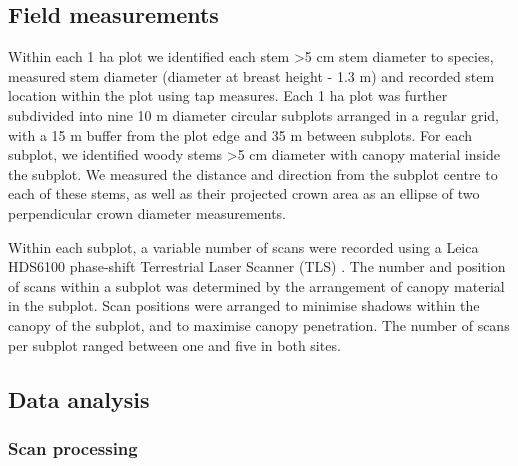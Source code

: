 \documentclass[11pt,a4paper]{article}
\begin{document}
\subsection{Field measurements}

Within each 1 ha plot we identified each stem >5 cm stem diameter to species, measured stem diameter (diameter at breast height - 1.3 m) and recorded stem location within the plot using tap measures. Each 1 ha plot was further subdivided into nine 10 m diameter circular subplots arranged in a regular grid, with a 15 m buffer from the plot edge and 35 m between subplots. For each subplot, we identified woody stems >5 cm diameter with canopy material inside the subplot. We measured the distance and direction from the subplot centre to each of these stems, as well as their projected crown area as an ellipse of two perpendicular crown diameter measurements.

Within each subplot, a variable number of scans were recorded using a Leica HDS6100 phase-shift Terrestrial Laser Scanner (TLS) \citep{Leica}. The number and position of scans within a subplot was determined by the arrangement of canopy material in the subplot. Scan positions were arranged to minimise shadows within the canopy of the subplot, and to maximise canopy penetration. The number of scans per subplot ranged between one and five in both sites. 

\subsection{Data analysis}

\subsubsection{Scan processing}
\end{document}
